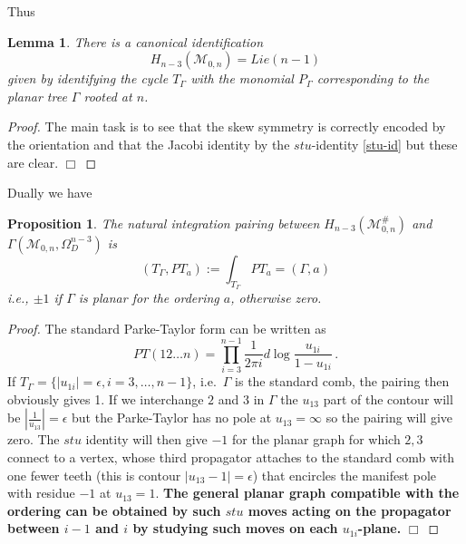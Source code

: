 \documentclass[11pt]{article}
\newcommand{\cM}{\mathcal{M}}
\newcommand{\1}{{\rm 1\hskip-0.25em I}}
\newtheorem{propn}{Proposition}[section]
\newtheorem{lemma}{Lemma}[section]
\begin{document}
Thus
\begin{lemma}
There is a canonical identification 
\begin{equation}
 H_{n-3}(\cM_{0,n})= Lie(n-1)
\end{equation}
given by identifying the cycle $T_\Gamma$ with the monomial $P_\Gamma$ corresponding to the planar tree $\Gamma$ rooted at $n$.
\end{lemma}

\begin{proof}
The main task is to see that the skew symmetry is correctly encoded by the orientation and that the Jacobi identity by the $stu$-identity \eqref{stu-id} but these are clear. $\Box$
\end{proof}


\smallskip




Dually we have 
\begin{propn}\label{T-PT-pairing}
The natural integration pairing  between $H_{n-3}(\cM^\#_{0,n})$ and $\Gamma(\cM_{0,n},\Omega^{n-3}_D)$ is \begin{equation}
(T_\Gamma,PT_a):=\int_{T_\Gamma}PT_a =(\Gamma,a)
\end{equation}
i.e., $\pm 1$ if $\Gamma $ is planar for the ordering $a$, otherwise zero. \end{propn}

\begin{proof}
The standard Parke-Taylor form can be written as 
\begin{equation}
PT(12\ldots n)=\prod_{i=3}^{n-1} \frac{1}{2\pi i}d\log \frac{ u_{1i}}{1- u_{1i}}\, .\label{comb-PT}
\end{equation}
If $T_\Gamma=\{|u_{1i}|=\epsilon, i=3,\ldots ,n-1\}$, i.e.\ $\Gamma $ is the standard comb, the pairing then obviously gives  1. If  we interchange $2$ and $3$ in $\Gamma$ the $u_{13}$ part of the contour will be $|\frac1{u_{13}}|=\epsilon$ but the Parke-Taylor has no pole at $u_{13}=\infty$ so the pairing will give zero. The $stu$ identity will then give $- 1$ for the planar graph for which $2,3$ connect to a vertex, whose third propagator  attaches to the standard comb with one fewer teeth (this is contour $|u_{13}-1|=\epsilon$) that encircles the manifest pole with residue $-1$ at $u_{13}=1$. {\bf The general planar graph compatible with the ordering can be obtained by such $stu$ moves acting on the propagator between $i-1$ and $i$ by studying such moves on each $u_{1i}$-plane.} $\Box$
\end{proof}
\end{document}
